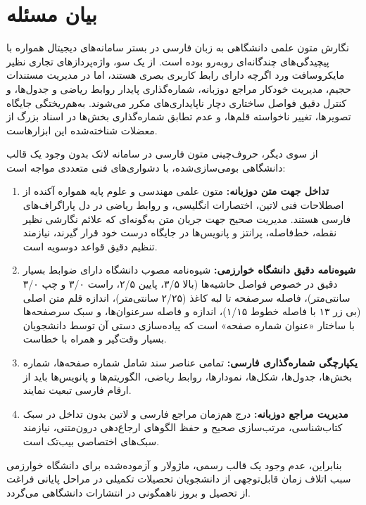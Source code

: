 \section{بیان مسئله}
\label{sec:ch1_problem}

نگارش متون علمی دانشگاهی به زبان فارسی در بستر سامانه‌های دیجیتال همواره با پیچیدگی‌های چندگانه‌ای روبه‌رو بوده است. از یک سو، واژه‌پردازهای تجاری نظیر مایکروسافت ورد اگرچه دارای رابط کاربری بصری هستند، اما در مدیریت مستندات حجیم، مدیریت خودکار مراجع دوزبانه، شماره‌گذاری پایدار روابط ریاضی و جدول‌ها، و کنترل دقیق فواصل ساختاری دچار ناپایداری‌های مکرر می‌شوند. به‌هم‌ریختگی جایگاه تصویرها، تغییر ناخواسته قلم‌ها، و عدم تطابق شماره‌گذاری بخش‌ها در اسناد بزرگ از معضلات شناخته‌شده این ابزارهاست.

از سوی دیگر، حروف‌چینی متون فارسی در سامانه لاتک بدون وجود یک قالب دانشگاهی بومی‌سازی‌شده، با دشواری‌های فنی متعددی مواجه است:
\begin{enumerate}
  \item \textbf{تداخل جهت متن دوزبانه:} متون علمی مهندسی و علوم پایه همواره آکنده از اصطلاحات فنی لاتین، اختصارات انگلیسی، و روابط ریاضی در دل پاراگراف‌های فارسی هستند. مدیریت صحیح جهت جریان متن به‌گونه‌ای که علائم نگارشی نظیر نقطه، خط‌فاصله، پرانتز و پانویس‌ها در جایگاه درست خود قرار گیرند، نیازمند تنظیم دقیق قواعد دوسویه است.
  \item \textbf{شیوه‌نامه دقیق دانشگاه خوارزمی:} شیوه‌نامه مصوب دانشگاه دارای ضوابط بسیار دقیق در خصوص فواصل حاشیه‌ها (بالا ۳/۵، پایین ۲/۵، راست ۳/۰ و چپ ۳/۰ سانتی‌متر)، فاصله سرصفحه تا لبه کاغذ (۲/۲۵ سانتی‌متر)، اندازه قلم متن اصلی (بی زر ۱۳ با فاصله خطوط ۱/۱۵)، اندازه و فاصله سرعنوان‌ها، و سبک سرصفحه‌ها با ساختار «عنوان \lr{|} شماره صفحه» است که پیاده‌سازی دستی آن توسط دانشجویان بسیار وقت‌گیر و همراه با خطاست.
  \item \textbf{یکپارچگی شماره‌گذاری فارسی:} تمامی عناصر سند شامل شماره صفحه‌ها، شماره بخش‌ها، جدول‌ها، شکل‌ها، نمودارها، روابط ریاضی، الگوریتم‌ها و پانویس‌ها باید از ارقام فارسی تبعیت نمایند.
  \item \textbf{مدیریت مراجع دوزبانه:} درج هم‌زمان مراجع فارسی و لاتین بدون تداخل در سبک کتاب‌شناسی، مرتب‌سازی صحیح و حفظ الگوهای ارجاع‌دهی درون‌متنی، نیازمند سبک‌های اختصاصی بیب‌تک است.
\end{enumerate}

بنابراین، عدم وجود یک قالب رسمی، ماژولار و آزموده‌شده برای دانشگاه خوارزمی سبب اتلاف زمان قابل‌توجهی از دانشجویان تحصیلات تکمیلی در مراحل پایانی فراغت از تحصیل و بروز ناهمگونی در انتشارات دانشگاهی می‌گردد.

